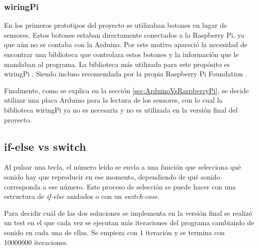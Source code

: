             \subsubsection{wiringPi} %
            \label{ssub:WiringPi}

                En los primeros prototipos del proyecto se utilizaban botones en lugar de sensores. Estos botones
                estaban directamente conectados a la Raspberry Pi, ya que aún no se contaba con la Arduino. Por este
                motivo apareció la necesidad de encontrar una biblioteca que controlara estos botones y la información
                que le mandaban al programa. La biblioteca más utilizada para este propósito es wiringPi
                \cite{wiringPi}. Siendo incluso recomendada por la propia Raspberry Pi Foundation
                \cite{wiringpi_raspberrypi_docu}.

                Finalmente, como se explica en la sección \ref{sec:ArduinoVsRaspberryPi}, se decide utilizar una placa
                Arduino para la lectura de los sensores, con lo cual la biblioteca wiringPi ya no es necesaria y no es
                utilizada en la versión final del proyecto.



        \subsection{if-else vs switch} %
        \label{sub:if-else_vs_switch}

            Al pulsar una tecla, el número leído se envía a una función que selecciona qué sonido hay que reproducir en
            ese momento, dependiendo de qué sonido corresponda a ese número. Este proceso de selección se puede hacer
            con una estructura de \textit{if-else} anidados o con un \textit{switch-case}.

            Para decidir cuál de las dos soluciones se implementa en la versión final se realizó un test en el que cada
            vez se ejecutan más iteraciones del programa cambiando de sonido en cada una de ellas. Se empieza con 1
            iteración y se termina con 10000000 iteraciones.

